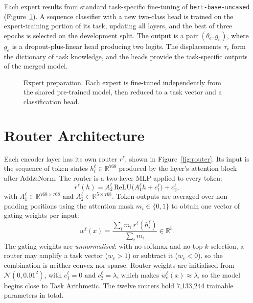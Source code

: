 Each expert results from standard task-specific fine-tuning of \texttt{bert-base-uncased} (Figure~\ref{fig:experts}). A sequence classifier with a new two-class head is trained on the expert-training portion of its task, updating all layers, and the best of three epochs is selected on the development split. The output is a pair $(\theta_e,g_e)$, where $g_e$ is a dropout-plus-linear head producing two logits. The displacements $\tau_e$ form the dictionary of task knowledge, and the heads provide the task-specific outputs of the merged model.

\begin{figure}[htbp]
  \centering
  \resizebox{.9\linewidth}{!}{}
  \caption{Expert preparation. Each expert is fine-tuned independently from the shared pre-trained model, then reduced to a task vector and a classification head.}
  \label{fig:experts}
\end{figure}

\section{Router Architecture}

Each encoder layer has its own router $r^{\ell}$, shown in Figure~\ref{fig:router}. Its input is the sequence of token states $h^{\ell}_i\in\mathbb{R}^{768}$ produced by the layer's attention block after Add\&Norm. The router is a two-layer MLP applied to every token:
\begin{equation}
r^{\ell}(h)=A^{\ell}_2\,\mathrm{ReLU}\big(A^{\ell}_1h+c^{\ell}_1\big)+c^{\ell}_2,
\label{eq:router}
\end{equation}
with $A^{\ell}_1\in\mathbb{R}^{768\times768}$ and $A^{\ell}_2\in\mathbb{R}^{5\times768}$. Token outputs are averaged over non-padding positions using the attention mask $m_i\in\{0,1\}$ to obtain one vector of gating weights per input:
\begin{equation}
w^{\ell}(x)=\frac{\sum_i m_i\,r^{\ell}(h^{\ell}_i)}{\sum_i m_i}\in\mathbb{R}^{5}.
\label{eq:gating}
\end{equation}
The gating weights are \emph{unnormalised}: with no softmax and no top-$k$ selection, a router may amplify a task vector ($w_e>1$) or subtract it ($w_e<0$), so the combination is neither convex nor sparse. Router weights are initialised from $\mathcal{N}(0,0.01^2)$, with $c^{\ell}_1=0$ and $c^{\ell}_2=\lambda$, which makes $w^{\ell}_e(x)\approx\lambda$, so the model begins close to Task Arithmetic. The twelve routers hold 7,133,244 trainable parameters in total.

